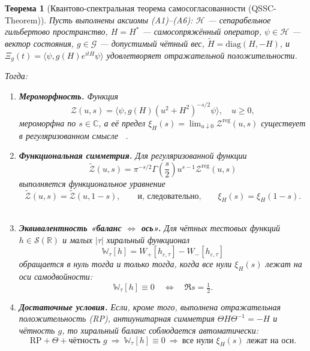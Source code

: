 \documentclass{article}
\numberwithin{equation}{section}
\theoremstyle{plain}
\newtheorem{theorem}{Теорема}
\theoremstyle{definition}
\theoremstyle{remark}
\def\Leftrightarrow{⇔}%
\begin{document}
\begin{theorem}[Квантово-спектральная теорема самосогласованности (QSSC-Theorem)]
\label{thm:QSSC_final}
Пусть выполнены аксиомы (A1)–(A6):  
$\mathcal H$ — сепарабельное гильбертово пространство,  
$H=H^\ast$ — самосопряжённый оператор,  
$\psi\in\mathcal H$ — вектор состояния,  
$g\in\mathcal G$ — допустимый чётный вес,  
$\widetilde H=\mathrm{diag}(H,-H)$,  
и $\Xi_g(t)=\langle\psi,g(H)e^{itH}\psi\rangle$ удовлетворяет отражательной положительности.

Тогда:
\begin{enumerate}[label=(\roman*),leftmargin=2.4em]
  \item \textbf{Мероморфность.}  
  Функция
  \begin{equation}
  \mathcal Z(u,s)
  =\langle\psi,g(H)(u^2+H^2)^{-s/2}\psi\rangle,\quad u\ge0,
  \end{equation}
  мероморфна по $s\in\mathbb C$,
  а её предел $\xi_H(s)=\lim_{u\downarrow0}\mathcal Z^{\mathrm{reg}}(u,s)$ существует в регуляризованном смысле ~\cite{Voros1987}.

  \item \textbf{Функциональная симметрия.}  
  Для регуляризованной функции
  \begin{equation}
  \widetilde{\mathcal Z}(u,s)
  =\pi^{-s/2}\Gamma\!\left(\frac{s}{2}\right)
  u^{s-1}\mathcal Z^{\mathrm{reg}}(u,s)
  \end{equation}
  выполняется функциональное уравнение
  \begin{equation}
  \widetilde{\mathcal Z}(u,s)=\widetilde{\mathcal Z}(u,1-s),
  \qquad\text{и, следовательно,}\qquad
  \xi_H(s)=\xi_H(1-s).
  \end{equation}
  ~\cite{Hecke1944}

  \item \textbf{Эквивалентность «баланс $\Leftrightarrow$ ось».}  
  Для чётных тестовых функций $h\in\mathcal S(\mathbb R)$ и малых $|\tau|$
  хиральный функционал
  \begin{equation}
  \mathbb W_\tau[h]=W_+[h_{\varepsilon,\tau}]-W_-[h_{\varepsilon,\tau}]
  \end{equation}
  обращается в нуль тогда и только тогда, когда все нули $\xi_H(s)$
  лежат на оси самодвойности:
  \begin{equation}
  \mathbb W_\tau[h]\equiv 0
  \quad\Longleftrightarrow\quad
  \Re s=\tfrac12.
  \end{equation}

  \item \textbf{Достаточные условия.}  
  Если, кроме того, выполнена отражательная положительность (RP),
  антиунитарная симметрия $\Theta H\Theta^{-1}=-H$ и чётность $g$,
  то хиральный баланс соблюдается автоматически:
  \begin{equation}
  \text{RP}+\Theta+\text{чётность }g
  \ \Longrightarrow\
  \mathbb W_\tau[h]\equiv0
  \ \Longrightarrow\
  \text{все нули }\xi_H(s)\text{ лежат на оси.}
  \end{equation}
\end{enumerate}
\end{theorem}
~\cite{Jaffe2007}
\end{document}
